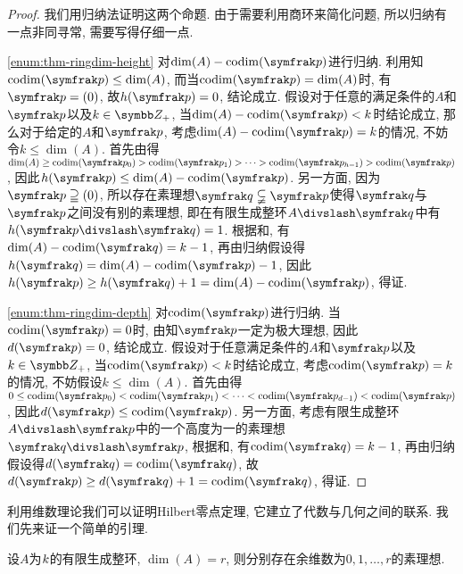 \begin{proof}
  我们用归纳法证明这两个命题. 由于需要利用商环来简化问题, 所以归纳有一点非同寻常, 需要写得仔细一点.

  \ref{enum:thm-ringdim-height} 对$\dim (A)-\codim (\ideal{p})$进行归纳. 利用知$\codim (\ideal{p})\leq \dim (A)$, 而当$\codim (\ideal{p})=\dim (A)$时, 有$\ideal{p}=(0)$, 故$h(\ideal{p})=0$, 结论成立. 假设对于任意的满足条件的$A$和$\ideal{p}$以及$k\in\ZZ_+$, 当$\dim (A)-\codim (\ideal{p})< k$时结论成立, 那么对于给定的$A$和$\ideal{p}$, 考虑$\dim (A)-\codim (\ideal{p})=k$的情况, 不妨令$k\leq \dim (A)$. 首先由得$\dim (A)\geq\codim (\ideal{p}_0)>\codim (\ideal{p}_1)>\dotsb >\codim (\ideal{p}_{h-1})>\codim (\ideal{p})$, 因此$h(\ideal{p})\leq \dim (A)-\codim (\ideal{p})$. 另一方面, 因为$\ideal{p}\supseteqq (0)$, 所以存在素理想$\ideal{q}\subsetneqq \ideal{p}$使得$\ideal{q}$与$\ideal{p}$之间没有别的素理想, 即在有限生成整环$A{\divslash}\ideal{q}$中有$h(\ideal{p}{\divslash}\ideal{q})=1$. 根据和, 有$\dim (A)-\codim (\ideal{q})=k-1$, 再由归纳假设得$h(\ideal{q})=\dim (A)-\codim (\ideal{p})-1$, 因此$h(\ideal{p})\geq h(\ideal{q})+1 = \dim (A)-\codim (\ideal{p})$, 得证.

  \ref{enum:thm-ringdim-depth} 对$\codim (\ideal{p})$进行归纳. 当$\codim (\ideal{p})=0$时, 由知$\ideal{p}$一定为极大理想, 因此$d(\ideal{p})=0$, 结论成立. 假设对于任意满足条件的$A$和$\ideal{p}$以及$k\in\ZZ_+$, 当$\codim(\ideal{p})<k$时结论成立, 考虑$\codim(\ideal{p})=k$的情况, 不妨假设$k\leq \dim (A)$. 首先由得 $0\leq\codim (\ideal{p}_0)<\codim (\ideal{p}_1)<\dotsb <\codim (\ideal{p}_{d-1})<\codim (\ideal{p})$, 因此$d(\ideal{p})\leq \codim (\ideal{p})$. 另一方面, 考虑有限生成整环$A{\divslash}\ideal{p}$中的一个高度为一的素理想$\ideal{q}{\divslash}\ideal{p}$, 根据和, 有$\codim (\ideal{q})=k-1$, 再由归纳假设得$d(\ideal{q})=\codim (\ideal{q})$, 故$d(\ideal{p})\geq d(\ideal{q})+1=\codim (\ideal{q})$, 得证.
\end{proof}

利用维数理论我们可以证明Hilbert零点定理, 它建立了代数与几何之间的联系. 我们先来证一个简单的引理.

\begin{proposition}\label{prop:ringdimprimeidealexist}
  设$A$为$k$的有限生成整环, $\dim (A)=r$, 则分别存在余维数为$0, 1, \dotsc, r$的素理想.
\end{proposition}

